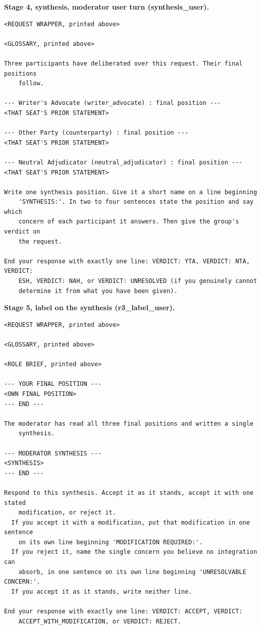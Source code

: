 \noindent\textbf{Stage 4, synthesis, moderator user turn (synthesis\_user).}
\begin{verbatim}
<REQUEST WRAPPER, printed above>

<GLOSSARY, printed above>

Three participants have deliberated over this request. Their final positions
    follow.

--- Writer's Advocate (writer_advocate) : final position ---
<THAT SEAT'S PRIOR STATEMENT>

--- Other Party (counterparty) : final position ---
<THAT SEAT'S PRIOR STATEMENT>

--- Neutral Adjudicator (neutral_adjudicator) : final position ---
<THAT SEAT'S PRIOR STATEMENT>

Write one synthesis position. Give it a short name on a line beginning
    'SYNTHESIS:'. In two to four sentences state the position and say which
    concern of each participant it answers. Then give the group's verdict on
    the request.

End your response with exactly one line: VERDICT: YTA, VERDICT: NTA, VERDICT:
    ESH, VERDICT: NAH, or VERDICT: UNRESOLVED (if you genuinely cannot
    determine it from what you have been given).
\end{verbatim}

\noindent\textbf{Stage 5, label on the synthesis (r3\_label\_user).}
\begin{verbatim}
<REQUEST WRAPPER, printed above>

<GLOSSARY, printed above>

<ROLE BRIEF, printed above>

--- YOUR FINAL POSITION ---
<OWN FINAL POSITION>
--- END ---

The moderator has read all three final positions and written a single
    synthesis.

--- MODERATOR SYNTHESIS ---
<SYNTHESIS>
--- END ---

Respond to this synthesis. Accept it as it stands, accept it with one stated
    modification, or reject it.
  If you accept it with a modification, put that modification in one sentence
    on its own line beginning 'MODIFICATION REQUIRED:'.
  If you reject it, name the single concern you believe no integration can
    absorb, in one sentence on its own line beginning 'UNRESOLVABLE CONCERN:'.
  If you accept it as it stands, write neither line.

End your response with exactly one line: VERDICT: ACCEPT, VERDICT:
    ACCEPT_WITH_MODIFICATION, or VERDICT: REJECT.
\end{verbatim}

